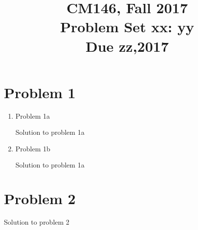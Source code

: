 \documentclass[11pt]{article}
\newcommand{\cnum}{CM146}
\newcommand{\ced}{Fall 2017}
\newcommand{\ctitle}[3]{\title{\vspace{-0.5in}\cnum, \ced\\Problem Set #1: #2\\Due #3}}
\newcommand{\solution}[1]{{{\color{blue}{\bf Solution:} {#1}}}}
\begin{document}
\ctitle{xx}{yy}{zz,2017}
\author{}
\date{}
\maketitle
\vspace{-0.75in}

\section{Problem 1}
\begin{enumerate}
\item Problem 1a

\solution{Solution to problem 1a}

\vspace{10cm}
\item Problem 1b

\solution{Solution to problem 1a}
\end{enumerate}

\newpage
\section{Problem 2}

\solution{Solution to problem 2}
\newpage
\end{document}
